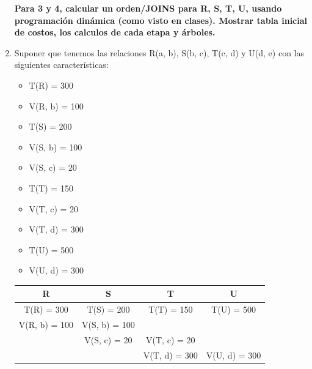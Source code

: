 \documentclass{templateNote}
\newcommand{\newparagraph}{\par\vspace{\baselineskip}\noindent}
\begin{document}
\begin{enumerate}
    \newpage
    \textbf{Para 3 y 4, calcular un orden/JOINS para R, S, T, U, usando programación dinámica (como visto en clases). Mostrar tabla inicial de costos, los calculos de cada etapa y árboles.}
    \item Suponer que tenemos las relaciones R(a, b), S(b, c), T(c, d) y U(d, e) con las siguientes características:
    \newparagraph
    \begin{minipage}{0.5\textwidth}
        \begin{itemize}
            \item T(R) = 300
            \item V(R, b) = 100
            \item T(S) = 200
            \item V(S, b) = 100
            \item V(S, c) = 20
        \end{itemize}
    \end{minipage}
    \hfill
    \begin{minipage}{0.5\textwidth}
        \begin{itemize}
            \item T(T) = 150
            \item V(T, c) = 20
            \item V(T, d) = 300
            \item T(U) = 500
            \item V(U, d) = 300
        \end{itemize}
    \end{minipage}
    \newparagraph
    \begin{center}
        \begin{tabular}{|c|c|c|c|}
            \hline
            R & S & T & U \\
            \hline
            T(R) = 300 & T(S) = 200 & T(T) = 150 & T(U) = 500 \\
            V(R, b) = 100 & V(S, b) = 100 & & \\
            & V(S, c) = 20 & V(T, c) = 20 & \\
            & & V(T, d) = 300 & V(U, d) = 300 \\
            \hline
        \end{tabular}
    \end{center}
    \newparagraph


\end{enumerate}
\end{document}
